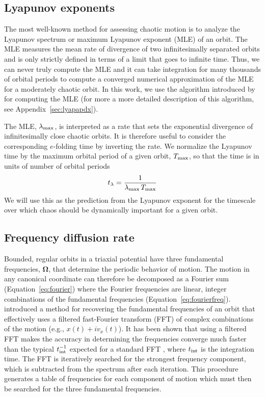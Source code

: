 \documentclass[letterpaper,12pt,preprint]{aastex}
\newcommand{\bs}[1]{\boldsymbol{#1}}
\newcommand{\inttime}{t_{\rm int}}
\begin{document}
\subsection{Lyapunov exponents} \label{sec:lyap}

The most well-known method for assessing chaotic motion is to analyze the Lyapunov spectrum or maximum Lyapunov exponent (MLE) of an orbit. The MLE measures the mean rate of divergence of two infinitesimally separated orbits and is only strictly defined in terms of a limit that goes to infinite time. Thus, we can never truly compute the MLE and it can take integration for many thousands of orbital periods to compute a converged numerical approximation of the MLE for a moderately chaotic orbit. In this work, we use the algorithm introduced by \cite{wolf85} for computing the MLE (for more a more detailed description of this algorithm, see Appendix~\ref{sec:lyapapdx}).

The MLE, $\lambda_{\rm max}$, is interpreted as a rate that sets the exponential divergence of infinitesimally close chaotic orbits. It is therefore useful to consider the corresponding $e$-folding time by inverting the rate. We normalize the Lyapunov time by the maximum orbital period of a given orbit, $T_{\rm max}$, so that the time is in units of number of orbital periods
\begin{equation}
	t_{\rm \lambda} = \frac{1}{\lambda_{\rm max} \, T_{\rm max}}
\end{equation}
We will use this as the prediction from the Lyapunov exponent for the timescale over which chaos should be dynamically important for a given orbit. 

\subsection{Frequency diffusion rate}\label{sec:naff}

Bounded, regular orbits in a triaxial potential have three fundamental frequencies, $\bs{\Omega}$, that determine the periodic behavior of motion. The motion in any canonical coordinate can therefore be decomposed as a Fourier sum (Equation~\ref{eq:fourier}) where the Fourier frequencies are linear, integer combinations of the fundamental frequencies (Equation~\ref{eq:fourierfreq}). \cite{laskar93} introduced a method for recovering the fundamental frequencies of an orbit that effectively uses a filtered fast-Fourier transform (FFT) of complex combinations of the motion (e.g., $x(t) + i v_x(t)$). It has been shown that using a filtered FFT makes the accuracy in determining the frequencies converge much faster than the typical $\inttime^{-1}$ expected for a standard FFT \citep{laskar99}, where $\inttime$ is the integration time. The FFT is iteratively searched for the strongest frequency component, which is subtracted from the spectrum after each iteration. This procedure generates a table of frequencies for each component of motion which must then be searched for the three fundamental frequencies.
\end{document}
